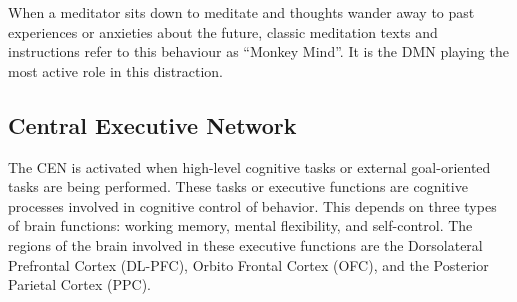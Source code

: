 \documentclass[a4paper, amsfonts, amssymb, amsmath, reprint, showkeys, nofootinbib, twoside]{revtex4-1}
\begin{document}
When a meditator sits down to meditate and thoughts wander away to past experiences
or anxieties about the future, classic meditation texts and instructions refer to
this behaviour as ``Monkey Mind''. It is the DMN playing the most active role in this
distraction.

\subsection{Central Executive Network}

The CEN is activated when high-level cognitive tasks or external goal-oriented tasks
are being performed. These tasks or executive functions are cognitive processes involved in
cognitive control of behavior. This depends on three types of brain functions:
working memory, mental flexibility, and self-control. The regions of the brain
involved in these executive functions are the Dorsolateral Prefrontal Cortex
(DL-PFC), Orbito Frontal Cortex (OFC), and the Posterior Parietal Cortex (PPC).
\end{document}

